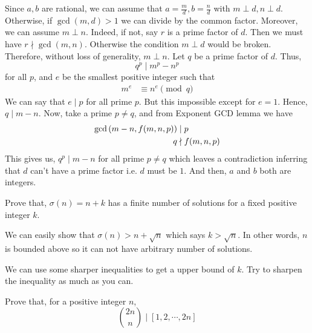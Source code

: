 \begin{solution}
	Since $a,b$ are rational, we can assume that $a=\frac{m}{d},b=\frac{n}{d}$ with $m\perp d,n\perp d$. Otherwise, if $\gcd(m,d)>1$ we can divide by the common factor. Moreover, we can assume $m\perp n$. Indeed, if not, say $r$ is a prime factor of $d$. Then we must have $r\nmid\gcd(m,n)$. Otherwise the condition $m\perp d$ would be broken. Therefore, without loss of generality, $m\perp n$. Let $q$ be a prime factor of $d$. Thus, \[q^p\mid m^p-n^p\] for all $p$, and $e$ be the smallest positive integer such that
		\begin{align*}
			m^e
				& \equiv n^e\pmod q
		\end{align*}
	We can say that $e\mid p$ for all prime $p$. But this impossible except for $e=1$. Hence, $q\mid m-n$. Now, take a prime $p\neq q$, and from Exponent GCD lemma we have
		\begin{align*}
			\gcd\left(m-n,f(m,n,p)\right)
				& \mid  p\\
			q
				& \nmid  f(m,n,p)
		\end{align*}
	This gives us, $q^p\mid m-n$ for all prime $p\neq q$ which leaves a contradiction inferring that $d$ can't have a prime factor i.e. $d$ must be $1$. And then, $a$ and $b$ both are integers.
\end{solution}

\begin{problem}
	Prove that, $\sigma(n)=n+k$ has a finite number of solutions for a fixed positive integer $k$.
\end{problem}

\begin{solution}
	We can easily show that $\sigma(n)>n+\sqrt{n}$ which says $k>\sqrt{n}$. In other words, $n$ is bounded above so it can not have arbitrary number of solutions.
\end{solution}

\begin{note}
	We can use some sharper inequalities to get a upper bound of $k$. Try to sharpen the inequality as much as you can.
\end{note}

\begin{problem}
	Prove that, for a positive integer $n$, \[\binom{2n}{n}\mid [1,2,\cdots,2n]\]
\end{problem}

